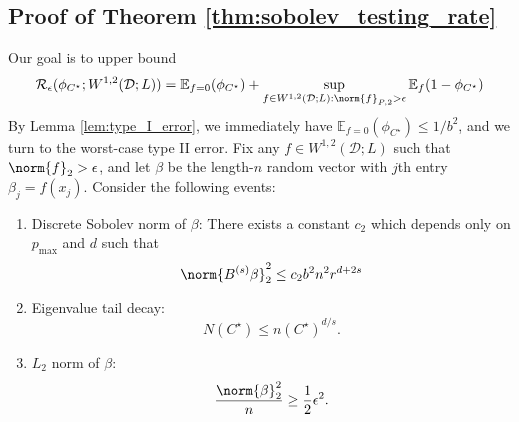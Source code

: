 \documentclass{article}
\newcommand{\1}{\mathbf{1}}
\newcommand{\Ebb}{\mathbb{E}}
\theoremstyle{alden}
\theoremstyle{aldenthm}
\theoremstyle{definition}
\theoremstyle{remark}
\begin{document}
\subsection{Proof of Theorem \ref{thm:sobolev_testing_rate}}
Our goal is to upper bound
\begin{equation*}
\mathcal{R}_{\epsilon}(\phi_{C^{\star}}; W^{1,2}(\mathcal{D};L)) = \Ebb_{f = 0}(\phi_{C^{\star}}) + \sup_{f \in W^{1,2}(\mathcal{D};L): \norm{f}_{P,2} > \epsilon} \Ebb_{f}(1 - \phi_{C^{\star}})
\end{equation*}
By Lemma \ref{lem:type_I_error}, we immediately have $\Ebb_{f = 0}(\phi_{C^{\star}}) \leq 1/b^2$, and we turn to the worst-case type II error. Fix any $f \in W^{1,2}(\mathcal{D};L)$ such that $\norm{f}_2 > \epsilon$, and let $\beta$ be the length-$n$ random vector with $j$th entry $\beta_j = f(x_j)$. Consider the following events:
\begin{enumerate}[label=(E\arabic*)]
	\item 
	\label{event:discrete_sobolev_norm}
	Discrete Sobolev norm of $\beta$: There exists a constant $c_2$ which depends only on $p_{\max}$ and $d$ such that
	\begin{equation*}
	\norm{B^{(s)}\beta}_2^2 \leq c_2 b^2 n^2 r^{d + 2s} 
	\end{equation*}
	\item 
	\label{event:eigenvalue_tail_decay}
	Eigenvalue tail decay:
	\begin{equation*}
	N(C^{\star}) \leq n(C^{\star})^{d/s}.
	\end{equation*}
	\item 
	\label{event:l2_norm}
	$L_2$ norm of $\beta$:
	\begin{equation*}
	\frac{\norm{\beta}_2^2}{n} \geq \frac{1}{2}\epsilon^2.
	\end{equation*}
\end{enumerate} 
\end{document}

